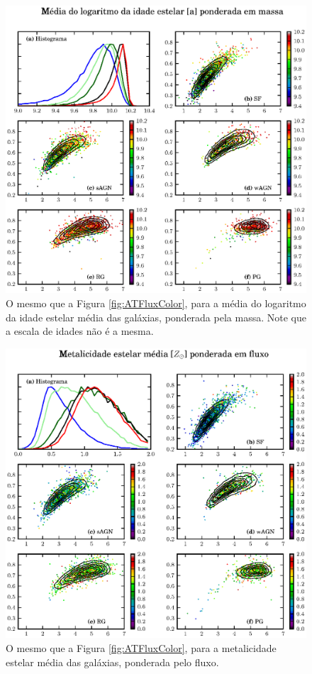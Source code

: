 \begin{figure}
	\includegraphics{figuras/uvcolor-color-at_mass-byclass.eps}
	\caption[Idade estelar média ponderada em massa no diagrama cor--cor.]
	{O mesmo que a Figura \ref{fig:ATFluxColor}, para a média do logaritmo da idade
	estelar média das galáxias, ponderada pela massa. Note que a escala de idades
	não é a mesma.}
	\label{fig:ATMassColor}
\end{figure}

\begin{figure}
	\includegraphics{figuras/uvcolor-color-am_flux-byclass.eps}
	\caption[Metalicidade estelar média ponderada em fluxo no diagrama cor--cor.]
	{O mesmo que a Figura \ref{fig:ATFluxColor}, para a metalicidade estelar média
	das galáxias, ponderada pelo fluxo.}
	\label{fig:AMFluxColor}
\end{figure}

